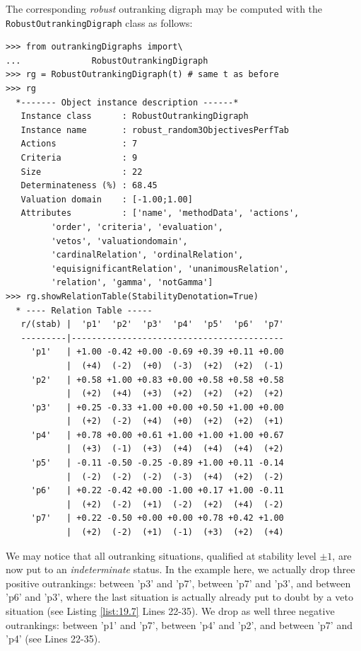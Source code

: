 The corresponding \emph{robust} outranking digraph may be computed with the \texttt{RobustOutrankingDigraph} class as follows:
\begin{lstlisting}[caption={Computing a robust outranking digraph},label=list:19.7]
>>> from outrankingDigraphs import\
...              RobustOutrankingDigraph
>>> rg = RobustOutrankingDigraph(t) # same t as before
>>> rg
  *------- Object instance description ------*
   Instance class      : RobustOutrankingDigraph
   Instance name       : robust_random3ObjectivesPerfTab
   Actions             : 7
   Criteria            : 9
   Size                : 22
   Determinateness (%) : 68.45
   Valuation domain    : [-1.00;1.00]
   Attributes          : ['name', 'methodData', 'actions',
         'order', 'criteria', 'evaluation',
         'vetos', 'valuationdomain',
         'cardinalRelation', 'ordinalRelation',
         'equisignificantRelation', 'unanimousRelation',
         'relation', 'gamma', 'notGamma']
>>> rg.showRelationTable(StabilityDenotation=True)
  * ---- Relation Table -----
   r/(stab) |  'p1'  'p2'  'p3'  'p4'  'p5'  'p6'  'p7'   
   ---------|------------------------------------------
     'p1'   | +1.00 -0.42 +0.00 -0.69 +0.39 +0.11 +0.00  
            |  (+4)  (-2)  (+0)  (-3)  (+2)  (+2)  (-1)  
     'p2'   | +0.58 +1.00 +0.83 +0.00 +0.58 +0.58 +0.58  
            |  (+2)  (+4)  (+3)  (+2)  (+2)  (+2)  (+2)  
     'p3'   | +0.25 -0.33 +1.00 +0.00 +0.50 +1.00 +0.00  
            |  (+2)  (-2)  (+4)  (+0)  (+2)  (+2)  (+1)  
     'p4'   | +0.78 +0.00 +0.61 +1.00 +1.00 +1.00 +0.67  
            |  (+3)  (-1)  (+3)  (+4)  (+4)  (+4)  (+2)  
     'p5'   | -0.11 -0.50 -0.25 -0.89 +1.00 +0.11 -0.14  
            |  (-2)  (-2)  (-2)  (-3)  (+4)  (+2)  (-2)  
     'p6'   | +0.22 -0.42 +0.00 -1.00 +0.17 +1.00 -0.11  
            |  (+2)  (-2)  (+1)  (-2)  (+2)  (+4)  (-2)  
     'p7'   | +0.22 -0.50 +0.00 +0.00 +0.78 +0.42 +1.00  
            |  (+2)  (-2)  (+1)  (-1)  (+3)  (+2)  (+4)  
\end{lstlisting}
We may notice that all outranking situations, qualified at stability level $\pm 1$, are now put to an \emph{indeterminate} status. In the example here, we actually drop three positive outrankings: between 'p3' and 'p7', between 'p7' and 'p3', and between 'p6' and 'p3', where the last situation is actually already put to doubt by a veto situation (see Listing \ref{list:19.7} Lines 22-35). We drop as well three negative outrankings: between 'p1' and 'p7', between 'p4' and 'p2', and between 'p7' and 'p4' (see Lines 22-35).

